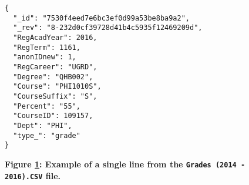 \begin{figure}[H]
  \centering
  \begin{mdframed}
    \centering
    \begin{verbatim}
{
  "_id": "7530f4eed7e6bc3ef0d99a53be8ba9a2",
  "_rev": "8-232d0cf39728d41b4c5935f12469209d",
  "RegAcadYear": 2016,
  "RegTerm": 1161,
  "anonIDnew": 1,
  "RegCareer": "UGRD",
  "Degree": "QHB002",
  "Course": "PHI1010S",
  "CourseSuffix": "S",
  "Percent": "55",
  "CourseID": 109157,
  "Dept": "PHI",
  "type_": "grade"
}    
        \end{verbatim}
  \end{mdframed}
  \caption[Grade Document JSON Sample]{\textbf{Figure \ref{fig-grades-json-sample}: Example of a single line from the \texttt{Grades (2014 - 2016).CSV} file.}}
  \label{fig-grades-json-sample}
\end{figure}